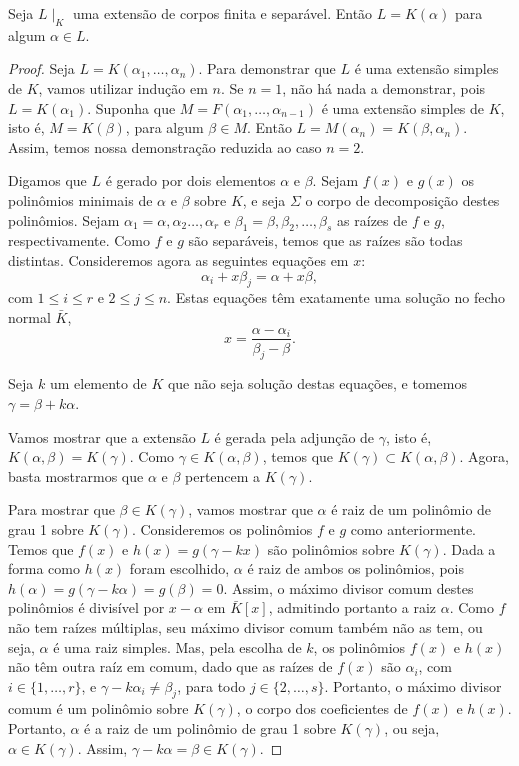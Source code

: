 \begin{teo}
\label{teo:elprimitivo}
Seja $L\mid_K$ uma extensão de corpos finita e separável. Então $L=K(\alpha)$ para algum $\alpha \in L$.
\begin{proof}
Seja $L= K(\alpha_1, \dots,\alpha_n)$. Para demonstrar que $L$ é uma extensão simples de $K$, vamos utilizar indução em $n$. Se $n=1$, não há nada a demonstrar, pois $L=K(\alpha_1)$. Suponha que $M=F(\alpha_1,\dots,\alpha_{n-1})$ é uma extensão simples de $K$, isto é, $M = K(\beta)$, para algum $\beta \in M$. Então $L = M(\alpha_n) = K(\beta, \alpha_n)$. Assim, temos nossa demonstração reduzida ao caso $n=2$. \par 
Digamos que $L$ é gerado por dois elementos $\alpha$ e $\beta$. Sejam $f(x)$ e $g(x)$ os polinômios minimais de $\alpha$ e $\beta$ sobre $K$, e seja $\Sigma$ o corpo de decomposição destes polinômios. Sejam $\alpha_1 = \alpha, \alpha_2 \dots, \alpha_r$ e $\beta_1 = \beta, \beta_2, \dots,\beta_s$ as raízes de $f$ e $g$, respectivamente. Como $f$ e $g$ são separáveis, temos que as raízes são todas distintas. Consideremos agora as seguintes equações em $x$:
\[\alpha_i + x \beta_j = \alpha + x \beta,\]
com $1\leq i \leq r$ e $2 \leq j \leq n$. Estas equações têm exatamente uma solução no fecho normal $\bar{K}$, \[x = \dfrac{\alpha - \alpha_i}{\beta_j - \beta}.\]

Seja $k$ um elemento de $K$ que não seja solução destas equações, e tomemos $\gamma = \beta + k \alpha$.  \par 
Vamos mostrar que a extensão $L$ é gerada pela adjunção de $\gamma$, isto é, $K(\alpha, \beta) = K (\gamma)$. Como $\gamma \in K(\alpha, \beta)$, temos que $K(\gamma) \subset K(\alpha,\beta)$. Agora, basta mostrarmos que $\alpha$ e $\beta$ pertencem a $K(\gamma)$. \par 
Para mostrar que $\beta \in K(\gamma)$, vamos mostrar que $\alpha$ é raiz de um polinômio de grau 1 sobre $K(\gamma)$. Consideremos os polinômios $f$ e $g$ como anteriormente. Temos que $f(x)$ e $h(x) = g(\gamma-kx)$ são polinômios sobre $K(\gamma)$. Dada a forma como $h(x)$ foram escolhido, $\alpha$ é raiz de ambos os polinômios, pois $h(\alpha) = g(\gamma - k\alpha) = g(\beta) = 0$. Assim, o máximo divisor comum destes polinômios é divisível por $x-\alpha$ em $\bar{K}[x]$, admitindo portanto a raiz $\alpha$. Como $f$ não tem raízes múltiplas, seu máximo divisor comum também não as tem, ou seja, $\alpha$ é uma raiz simples. Mas, pela escolha de $k$, os polinômios $f(x)$ e $h(x)$ não têm outra raíz em comum, dado que as raízes de $f(x)$ são $\alpha_i$, com $i \in \{1,\dots, r\}$, e $\gamma - k\alpha_i \neq \beta_j$, para todo $j\in \{2,\dots, s\}$. Portanto, o máximo divisor comum é um polinômio sobre $K(\gamma)$, o corpo dos coeficientes de $f(x)$ e $h(x)$. Portanto, $\alpha$ é a raiz de um polinômio de grau 1 sobre $K(\gamma)$, ou seja, $\alpha \in K(\gamma)$. Assim, $\gamma - k\alpha = \beta \in K(\gamma)$.
\end{proof}
\end{teo}

